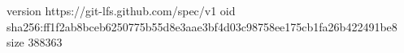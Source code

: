 version https://git-lfs.github.com/spec/v1
oid sha256:ff1f2ab8bceb6250775b55d8e3aae3bf4d03c98758ee175cb1fa26b422491be8
size 388363
